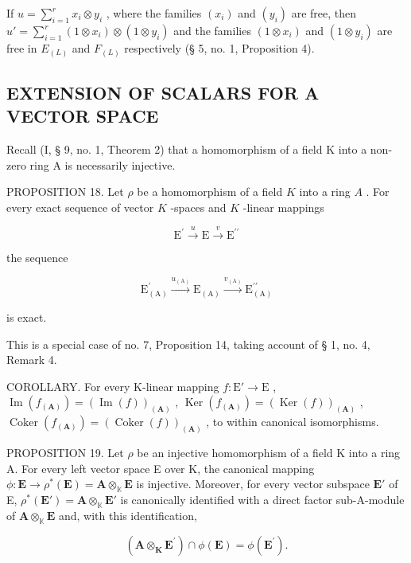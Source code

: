 If \(u = \sum_{i=1}^{r} x_i \otimes y_i\) , where the families \((x_i)\) and \((y_i)\) are free, then \(u' = \sum_{i=1}^{r} (1 \otimes x_i) \otimes (1 \otimes y_i)\) and the families \((1 \otimes x_i)\) and \((1 \otimes y_i)\) are free in \(E_{(L)}\) and \(F_{(L)}\) respectively (§ 5, no. 1, Proposition 4).

\subsection{EXTENSION OF SCALARS FOR A VECTOR SPACE}

Recall (I, § 9, no. 1, Theorem 2) that a homomorphism of a field K into a non-zero ring A is necessarily injective.

PROPOSITION 18. Let \(\rho\) be a homomorphism of a field \(K\) into a ring \(A\) . For every exact sequence of vector \(K\) -spaces and \(K\) -linear mappings

\[
\mathrm{E} ^ {\prime} \xrightarrow {u} \mathrm{E} \xrightarrow {v} \mathrm{E} ^ {\prime \prime}
\]

the sequence

\[
\mathrm{E} _ {(\mathrm{A})} ^ {\prime} \xrightarrow {u _ {(\mathrm{A})}} \mathrm{E} _ {(\mathrm{A})} \xrightarrow {v _ {(\mathrm{A})}} \mathrm{E} _ {(\mathrm{A})} ^ {\prime \prime}
\]

is exact.

This is a special case of no. 7, Proposition 14, taking account of § 1, no. 4, Remark 4.

COROLLARY. For every K-linear mapping \(f: \mathrm{E}' \to \mathrm{E}\) , \(\operatorname{Im}(f_{(\mathbf{A})}) = (\operatorname{Im}(f))_{(\mathbf{A})}\) , \(\operatorname{Ker}(f_{(\mathbf{A})}) = (\operatorname{Ker}(f))_{(\mathbf{A})}\) , \(\operatorname{Coker}(f_{(\mathbf{A})}) = (\operatorname{Coker}(f))_{(\mathbf{A})}\) , to within canonical isomorphisms.

PROPOSITION 19. Let \(\rho\) be an injective homomorphism of a field K into a ring A. For every left vector space E over K, the canonical mapping \(\phi: \mathbf{E} \to \rho^{*}(\mathbf{E}) = \mathbf{A} \otimes_{\mathbb{K}} \mathbf{E}\) is injective. Moreover, for every vector subspace \(\mathbf{E}'\) of E, \(\rho^{*}(\mathbf{E}') = \mathbf{A} \otimes_{\mathbb{K}} \mathbf{E}'\) is canonically identified with a direct factor sub-A-module of \(\mathbf{A} \otimes_{\mathbb{K}} \mathbf{E}\) and, with this identification,

\[
(\mathbf {A} \otimes_ {\mathbf {K}} \mathbf {E} ^ {\prime}) \cap \phi (\mathbf {E}) = \phi (\mathbf {E} ^ {\prime}).\tag{35}
\]

